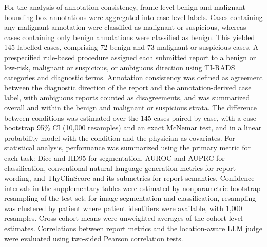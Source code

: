 \documentclass[fleqn,10pt]{wlscirep}
\begin{document}
For the analysis of annotation consistency, frame-level benign and malignant bounding-box annotations were aggregated into case-level labels. Cases containing any malignant annotation were classified as malignant or suspicious, whereas cases containing only benign annotations were classified as benign. This yielded 145 labelled cases, comprising 72 benign and 73 malignant or suspicious cases. A prespecified rule-based procedure assigned each submitted report to a benign or low-risk, malignant or suspicious, or ambiguous direction using TI-RADS categories and diagnostic terms. Annotation consistency was defined as agreement between the diagnostic direction of the report and the annotation-derived case label, with ambiguous reports counted as disagreements, and was summarized overall and within the benign and malignant or suspicious strata. The difference between conditions was estimated over the 145 cases paired by case, with a case-bootstrap 95\% CI (10,000 resamples) and an exact McNemar test, and in a linear probability model with the condition and the physician as covariates. For statistical analysis, performance was summarized using the primary metric for each task: Dice and HD95 for segmentation, AUROC and AUPRC for classification, conventional natural-language generation metrics for report wording, and ThyClinScore and its submetrics for report semantics. Confidence intervals in the supplementary tables were estimated by nonparametric bootstrap resampling of the test set; for image segmentation and classification, resampling was clustered by patient where patient identifiers were available, with 1{,}000 resamples. Cross-cohort means were unweighted averages of the cohort-level estimates. Correlations between report metrics and the location-aware LLM judge were evaluated using two-sided Pearson correlation tests.
\end{document}

